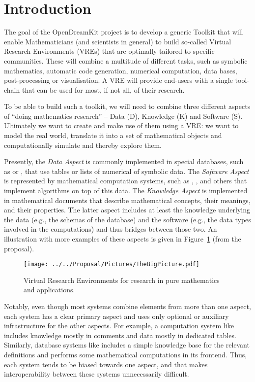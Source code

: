 \section{Introduction}\label{sec:intro}

The goal of the OpenDreamKit project \cite{ODKproposal:on} is to develop a generic Toolkit
that will enable Mathematicians (and scientists in general) to build so-called Virtual
Research Environments (VREs) that are optimally tailored to specific communities. These
will combine a multitude of different tasks, such as symbolic mathematics, automatic code
generation, numerical computation, data bases, post-processing or visualisation. A VRE
will provide end-users with a single tool-chain that can be used for most, if not all, of
their research.

To be able to build such a toolkit, we will need to combine three different aspects of
``doing mathematics research'' -- Data (D), Knowledge (K) and Software (S). Ultimately we want to
create and make use of them using a VRE: we want to model the real world, translate it
into a set of mathematical objects and computationally simulate and thereby explore them.

Presently, the \emph{Data Aspect} is commonly implemented in special databases, such as
\LMFDB or \OEIS, that use tables or lists of numerical of symbolic data. The
\emph{Software Aspect} is represented by mathematical computation systems, such as \GAP,
\SageMath, and others that implement algorithms on top of this data. The \emph{Knowledge
  Aspect} is implemented in mathematical documents that describe mathematical concepts,
their meanings, and their properties.  The latter aspect includes at least the knowledge
underlying the data (e.g., the schemas of the database) and the software (e.g., the data
types involved in the computations) and thus bridges between those two. An illustration
with more examples of these aspects is given in Figure~\ref{fig:thebigpicture} (from the
\pn proposal).

\begin{figure}[ht]\centering
  \texttt{[image: ../../Proposal/Pictures/TheBigPicture.pdf]}
  \caption{Virtual Research Environments for research in pure
    mathematics and applications.}
  \label{fig:thebigpicture}
\end{figure}

Notably, even though most systems combine elements from more than one aspect, each system has a clear primary aspect and uses only optional or auxiliary infrastructure for the other aspects.
For example, a computation system like \SageMath includes knowledge mostly in comments and data mostly in dedicated tables.
Similarly, database systems like \LMFDB includes a simple knowledge base for the relevant definitions and performs some mathematical computations in its frontend.
Thus, each system tends to be biased towards one aspect, and that makes interoperability between these systems unnecessarily difficult.

